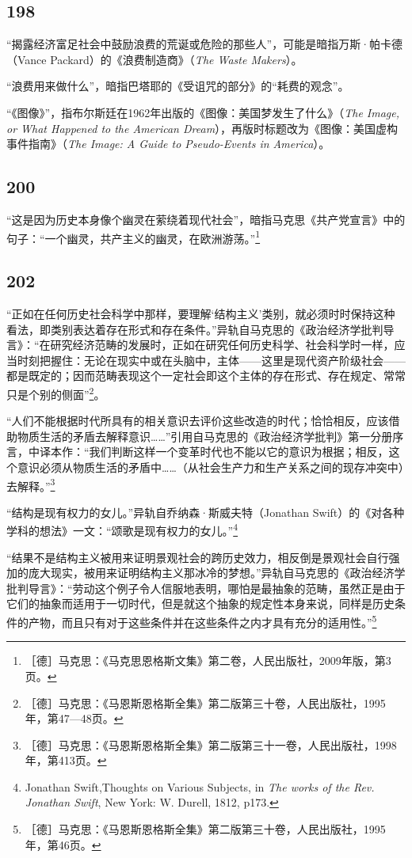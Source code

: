 \documentclass[fontset=fandol, a4paper, 12pt, openright]{ctexbook}
\begin{document}
\subsection*{198}
“揭露经济富足社会中鼓励浪费的荒诞或危险的那些人”，可能是暗指万斯·帕卡德（Vance Packard）的《浪费制造商》（\textit{The Waste Makers}）。

“浪费用来做什么”，暗指巴塔耶的《受诅咒的部分》的“耗费的观念”。

“《图像》”，指布尔斯廷在1962年出版的《图像：美国梦发生了什么》（\textit{The Image, or What Happened to the American Dream}），再版时标题改为《图像：美国虚构事件指南》（\textit{The Image: A Guide to Pseudo-Events in America}）。

\subsection*{200}
“这是因为历史本身像个幽灵在萦绕着现代社会”，暗指马克思《共产党宣言》中的句子：“一个幽灵，共产主义的幽灵，在欧洲游荡。”\footnote{［德］马克思：《马克思恩格斯文集》第二卷，人民出版社，2009年版，第3页。}

\subsection*{202}
“正如在任何历史社会科学中那样，要理解‘结构主义’类别，就必须时时保持这种看法，即类别表达着存在形式和存在条件。”异轨自马克思的《政治经济学批判导言》：“在研究经济范畴的发展时，正如在研究任何历史科学、社会科学时一样，应当时刻把握住：无论在现实中或在头脑中，主体——这里是现代资产阶级社会——都是既定的；因而范畴表现这个一定社会即这个主体的存在形式、存在规定、常常只是个别的侧面”\footnote{［德］马克思：《马恩斯恩格斯全集》第二版第三十卷，人民出版社，1995年，第47—48页。}。

“人们不能根据时代所具有的相关意识去评价这些改造的时代；恰恰相反，应该借助物质生活的矛盾去解释意识……”引用自马克思的《政治经济学批判》第一分册序言，中译本作：“我们判断这样一个变革时代也不能以它的意识为根据；相反，这个意识必须从物质生活的矛盾中……（从社会生产力和生产关系之间的现存冲突中）去解释。”\footnote{［德］马克思：《马恩斯恩格斯全集》第二版第三十一卷，人民出版社，1998年，第413页。}

“结构是现有权力的女儿。”异轨自乔纳森·斯威夫特（Jonathan Swift）的《对各种学科的想法》一文：“颂歌是现有权力的女儿。”\footnote{Jonathan Swift,Thoughts on Various Subjects, in\textit{ The works of the Rev. Jonathan Swift}, New York: W. Durell, 1812, p173.}

“结果不是结构主义被用来证明景观社会的跨历史效力，相反倒是景观社会自行强加的庞大现实，被用来证明结构主义那冰冷的梦想。”异轨自马克思的《政治经济学批判导言》：“劳动这个例子令人信服地表明，哪怕是最抽象的范畴，虽然正是由于它们的抽象而适用于一切时代，但是就这个抽象的规定性本身来说，同样是历史条件的产物，而且只有对于这些条件并在这些条件之内才具有充分的适用性。”\footnote{［德］马克思：《马恩斯恩格斯全集》第二版第三十卷，人民出版社，1995年，第46页。}
\end{document}
